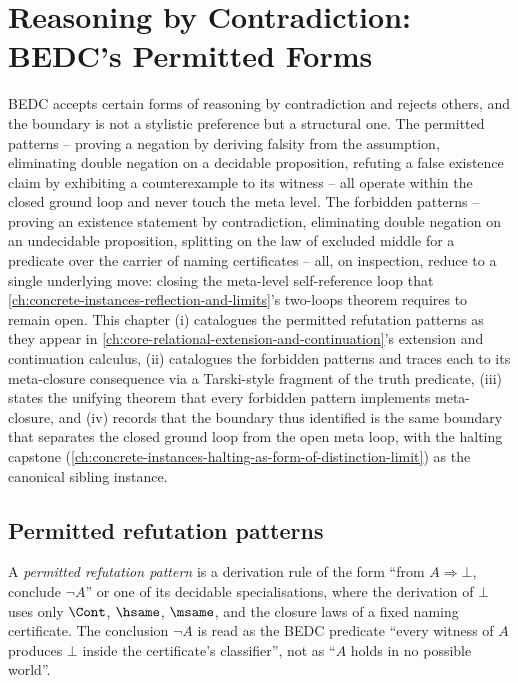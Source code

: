 \chapter{Reasoning by Contradiction: BEDC's Permitted Forms}
\label{ch:concrete-instances-reasoning-by-contradiction-boundary}

BEDC accepts certain forms of reasoning by contradiction and rejects others, and the boundary is not a stylistic preference but a structural one. The permitted patterns -- proving a negation by deriving falsity from the assumption, eliminating double negation on a decidable proposition, refuting a false existence claim by exhibiting a counterexample to its witness -- all operate within the closed ground loop and never touch the meta level. The forbidden patterns -- proving an existence statement by contradiction, eliminating double negation on an undecidable proposition, splitting on the law of excluded middle for a predicate over the carrier of naming certificates -- all, on inspection, reduce to a single underlying move: closing the meta-level self-reference loop that \autoref{ch:concrete-instances-reflection-and-limits}'s two-loops theorem requires to remain open. This chapter (i) catalogues the permitted refutation patterns as they appear in \autoref{ch:core-relational-extension-and-continuation}'s extension and continuation calculus, (ii) catalogues the forbidden patterns and traces each to its meta-closure consequence via a Tarski-style fragment of the truth predicate, (iii) states the unifying theorem that every forbidden pattern implements meta-closure, and (iv) records that the boundary thus identified is the same boundary that separates the closed ground loop from the open meta loop, with the halting capstone (\autoref{ch:concrete-instances-halting-as-form-of-distinction-limit}) as the canonical sibling instance.

\section{Permitted refutation patterns}
\label{sec:reasoning-by-contradiction-permitted}

\begin{definition}
\label{def:reasoning-permitted-pattern}
A \emph{permitted refutation pattern} is a derivation rule of the form ``from $A \Rightarrow \bot$, conclude $\neg A$'' or one of its decidable specialisations, where the derivation of $\bot$ uses only $\Cont$, $\hsame$, $\msame$, and the closure laws of a fixed naming certificate. The conclusion $\neg A$ is read as the BEDC predicate ``every witness of $A$ produces $\bot$ inside the certificate's classifier'', not as ``$A$ holds in no possible world''.
\end{definition}

